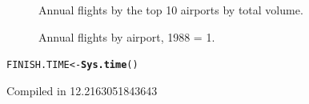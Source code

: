 \documentclass{scrreprt}\usepackage[]{graphicx}\usepackage[]{color}
\makeatletter
\newcommand{\hlstd}[1]{\textcolor[rgb]{0.345,0.345,0.345}{#1}}%
\newcommand{\hlkwb}[1]{\textcolor[rgb]{0.69,0.353,0.396}{#1}}%
\newcommand{\hlkwd}[1]{\textcolor[rgb]{0.737,0.353,0.396}{\textbf{#1}}}%
\newenvironment{kframe}{%
 \def\at@end@of@kframe{}%
 \ifinner\ifhmode%
  \def\at@end@of@kframe{\end{minipage}}%
  \begin{minipage}{\columnwidth}%
 \fi\fi%
 \def\FrameCommand##1{\hskip\@totalleftmargin \hskip-\fboxsep
 \colorbox{shadecolor}{##1}\hskip-\fboxsep
     \hskip-\linewidth \hskip-\@totalleftmargin \hskip\columnwidth}%
 \MakeFramed {\advance\hsize-\width
   \@totalleftmargin\z@ \linewidth\hsize
   \@setminipage}}%
 {\par\unskip\endMakeFramed%
 \at@end@of@kframe}
\newenvironment{knitrout}{}{} %
\makeatother
\begin{document}
\begin{figure}
\caption{Annual flights by the top 10 airports by total volume.}
\end{figure}

\begin{figure}
\caption{Annual flights by airport, 1988 = 1.}
\end{figure}


\begin{knitrout}
\color{fgcolor}\begin{kframe}
\begin{alltt}
\hlstd{FINISH.TIME} \hlkwb{<-} \hlkwd{Sys.time}\hlstd{()}
\end{alltt}
\end{kframe}
\end{knitrout}
Compiled in 12.2163051843643
\end{document}
